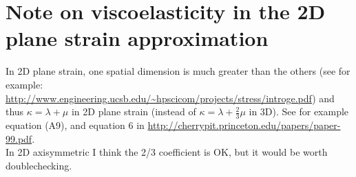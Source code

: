 \section{Note on viscoelasticity in the 2D plane strain approximation}

\noindent
In 2D plane strain, one spatial dimension is much greater than the others (see for example: \url{http://www.engineering.ucsb.edu/~hpscicom/projects/stress/introge.pdf})
and thus $\kappa = \lambda + \mu$ in 2D plane strain (instead of $\kappa = \lambda + \frac{2}{3} \mu$ in 3D).
See for example \cite{CaKoKo88b} equation (A9), and equation 6 in \url{http://cherrypit.princeton.edu/papers/paper-99.pdf}. \\

\noindent
In 2D axisymmetric I think the 2/3 coefficient is OK, but it would be worth doublechecking.

